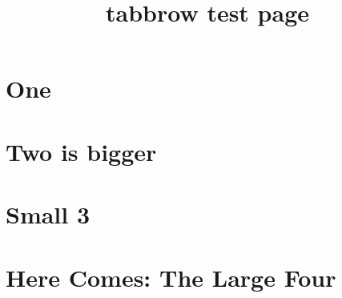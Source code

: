 \documentclass[oneside]{z-article}
\title{\boDz tabbrow test page}
\author{\xjlzh}
\begin{document}
    \maketitle

    \section{One}
    \lipsum[1-3]

    \section{Two is bigger}
    \lipsum[1-3]

    \section{Small 3}
    \lipsum[1-3]

    \section{Here Comes: The Large Four}
    \lipsum[1-3]
\end{document}
